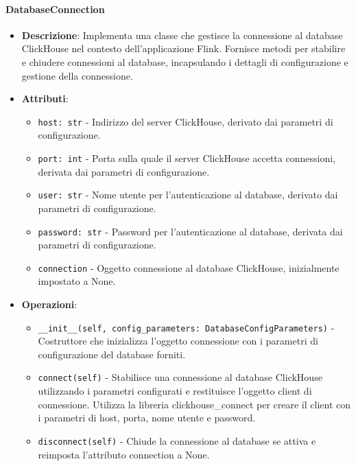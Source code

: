 \documentclass[10pt]{article}
\begin{document}
    \paragraph{DatabaseConnection}
    \begin{itemize} 
    \item \textbf{Descrizione}: Implementa una classe che gestisce la connessione al database ClickHouse nel contesto dell'applicazione Flink. Fornisce metodi per stabilire e chiudere connessioni al database, incapsulando i dettagli di configurazione e gestione della connessione.
    \item \textbf{Attributi}:
    \begin{itemize}
        \item \texttt{host: str} - Indirizzo del server ClickHouse, derivato dai parametri di configurazione.
        \item \texttt{port: int} - Porta sulla quale il server ClickHouse accetta connessioni, derivata dai parametri di configurazione.
        \item \texttt{user: str} - Nome utente per l'autenticazione al database, derivato dai parametri di configurazione.
        \item \texttt{password: str} - Password per l'autenticazione al database, derivata dai parametri di configurazione.
        \item \texttt{connection} - Oggetto connessione al database ClickHouse, inizialmente impostato a None.
    \end{itemize}
    
    \item \textbf{Operazioni}:
    \begin{itemize}
        \item \texttt{\_\_init\_\_(self, config\_parameters: DatabaseConfigParameters)} - Costruttore che inizializza l'oggetto connessione con i parametri di configurazione del database forniti.
        
        \item \texttt{connect(self)} - Stabilisce una connessione al database ClickHouse utilizzando i parametri configurati e restituisce l'oggetto client di connessione. Utilizza la libreria clickhouse\_connect per creare il client con i parametri di host, porta, nome utente e password.
        
        \item \texttt{disconnect(self)} - Chiude la connessione al database se attiva e reimposta l'attributo connection a None.
    \end{itemize}
    \end{itemize}
\end{document}
